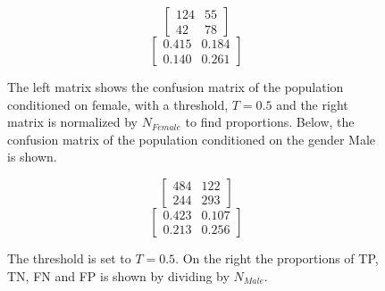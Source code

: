 \documentclass[11pt, fleqn, titlepage]{article}
\begin{document}
	
		\begin{figure}[h!]	
		\begin{multicols}{2}
			\begin{ceqn}
				\begin{equation*}
				\begin{bmatrix}
				124 & 55  \\
				42 & 78 
				\end{bmatrix} 
				\end{equation*} 
				\begin{equation*}
				\begin{bmatrix}
				0.415 & 0.184  \\
				0.140 & 0.261 
				\end{bmatrix} 
				\end{equation*}
			\end{ceqn}
		\end{multicols}
		{The left matrix shows the confusion matrix of the population conditioned on female, with a threshold, $ T = 0.5 $ and the right matrix is normalized by $N_{Female}$ to find proportions. Below, the confusion matrix of the population conditioned on the gender Male is shown.}
	\end{figure}
	\begin{figure}[h!]	
		\begin{multicols}{2}
			\begin{ceqn}
				\begin{equation*}
				\begin{bmatrix}
				484 & 122  \\
				244 & 293 
				\end{bmatrix} 
				\end{equation*} 
				\begin{equation*}
				\begin{bmatrix}
				0.423 & 0.107 \\
				0.213 & 0.256 
				\end{bmatrix} 
				\end{equation*}
			\end{ceqn}
		\end{multicols}
		{The threshold is set to $T = 0.5$. On the right the proportions of TP, TN, FN and FP is shown by dividing by $N_{Male}$.}
	\end{figure}
	
\end{document}
